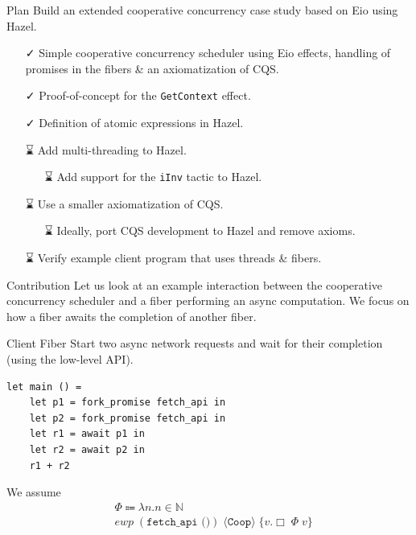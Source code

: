 \documentclass[aspectratio=43]{beamer}
\newcommand{\done}{{\symfontextra ✓}}
\newcommand{\tbd}{{\symfontextra ⌛}}
\newcommand{\proto}{\texttt{Coop}}
\newcommand{\ewp}[3]{\textit{ewp}\; (#1)\; \langle #2 \rangle\; \{#3\}}
\newcommand{\pers}[1]{\Box\; #1}
\begin{document}
\begin{frame}{Plan}
    Build an extended cooperative concurrency case study based on Eio using Hazel.
    \begin{itemize}
        \item[\done{}] Simple cooperative concurrency scheduler using Eio effects, handling of promises in the fibers \& an axiomatization of CQS.
        \item[\done{}] Proof-of-concept for the \texttt{GetContext} effect.
        \item[\done{}] Definition of atomic expressions in Hazel.
        \item[\tbd{}] Add multi-threading to Hazel.
            \begin{itemize}
                \item[\tbd{}] Add support for the \texttt{iInv} tactic to Hazel.
            \end{itemize}
        \item[\tbd{}] Use a smaller axiomatization of CQS.
            \begin{itemize}
                \item[\tbd{}] Ideally, port CQS development to Hazel and remove axioms.
            \end{itemize}
        \item[\tbd{}] Verify example client program that uses threads \& fibers.
    \end{itemize}
\end{frame}

\begin{frame}{Contribution}
    Let us look at an example interaction between the cooperative concurrency scheduler and a fiber performing an async computation.
    We focus on how a fiber awaits the completion of another fiber.
\end{frame}

\begin{frame}[fragile]{Client Fiber}
    Start two async network requests and wait for their completion (using the low-level API).
    \begin{verbatim}
let main () = 
    let p1 = fork_promise fetch_api in
    let p2 = fork_promise fetch_api in
    let r1 = await p1 in 
    let r2 = await p2 in 
    r1 + r2
    \end{verbatim}
    We assume
    \begin{align*}
         & \Phi \Coloneqq \lambda n. n \in \mathbb{N}                 \\
         & \ewp{\texttt{fetch\_api ()}}{\proto{}}{v. \pers{\Phi\; v}}
    \end{align*}
\end{frame}
\end{document}
